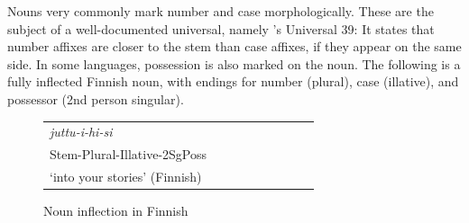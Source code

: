 \documentclass[11pt,letterpaper]{article}
\begin{document}
Nouns very commonly mark number and case morphologically.
These are the subject of a well-documented universal, namely \citep[112]{greenberg1963universals}'s Universal 39:
It states that number affixes are closer to the stem than case affixes, if they appear on the same side.
In some languages, possession is also marked on the noun.
The following is a fully inflected Finnish noun, with endings for number (plural), case (illative), and possessor (2nd person singular).



\begin{figure}
\begin{tabular}{lllllllll}
\textit{juttu-i-hi-si} \\
Stem-Plural-Illative-2SgPoss \\
`into your stories' (Finnish)
\end{tabular}
\caption{Noun inflection in Finnish}
\end{figure}
\end{document}
